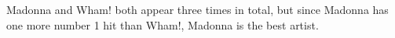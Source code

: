 \nextsample
Madonna and Wham! both appear three times in total, but since Madonna has one more number 1 hit than Wham!, Madonna is the best artist.